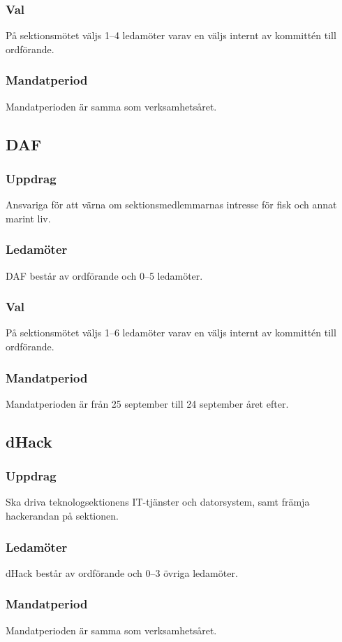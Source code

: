 \subsubsection{Val}
På sektionsmötet väljs 1--4 ledamöter varav en väljs internt av kommittén till ordförande.
\subsubsection{Mandatperiod}
Mandatperioden är samma som verksamhetsåret. 

\subsection{DAF}
\subsubsection{Uppdrag}
Ansvariga för att värna om sektionsmedlemmarnas intresse för fisk och
annat marint liv.
\subsubsection{Ledamöter}
DAF består av ordförande och 0--5 ledamöter. 
\subsubsection{Val}
På sektionsmötet väljs 1--6 ledamöter varav en väljs internt av kommittén till ordförande.
\subsubsection{Mandatperiod}
Mandatperioden är från 25 september till 24 september året efter.

\subsection{dHack}
\subsubsection{Uppdrag}
Ska driva teknologsektionens IT-tjänster och datorsystem, samt
främja hackerandan på sektionen.
\subsubsection{Ledamöter}
dHack består av ordförande och 0--3 övriga ledamöter.
\subsubsection{Mandatperiod}
Mandatperioden är samma som verksamhetsåret.

